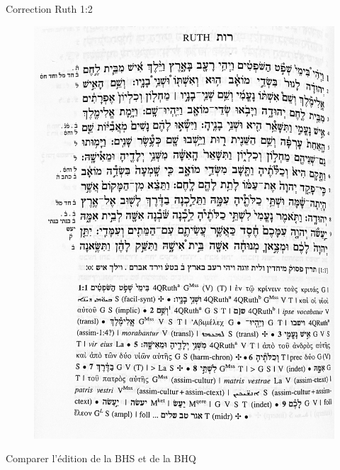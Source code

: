 \documentclass[11pt]{beamer}
\begin{document}
\begin{frame}{Correction Ruth 1:2}
\begin{figure}
    \centering
    \includegraphics[width=0.5\linewidth]{img/ruth_1_BHQ.jpeg}
\end{figure}
    
\end{frame}

\begin{frame}{Comparer l'édition de la BHS et de la BHQ}
    
\end{frame}
\end{document}
